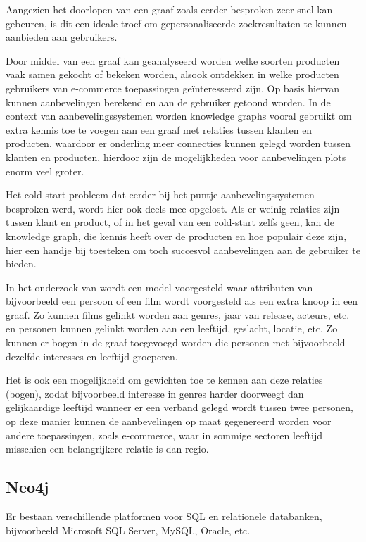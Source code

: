 Aangezien het doorlopen van een graaf zoals eerder besproken zeer snel kan gebeuren, is dit een ideale troef om gepersonaliseerde zoekresultaten te kunnen aanbieden aan gebruikers. \autocite{E-CommerceKnowledgeGraph}

Door middel van een graaf kan geanalyseerd worden welke soorten producten vaak samen gekocht of bekeken worden, alsook ontdekken in welke producten gebruikers van e-commerce toepassingen geïnteresseerd zijn. Op basis hiervan kunnen aanbevelingen berekend en aan de gebruiker getoond worden. 
\newpage
In de context van aanbevelingssystemen worden knowledge graphs vooral gebruikt om extra kennis toe te voegen aan een graaf met relaties tussen klanten en producten, waardoor er onderling meer connecties kunnen gelegd worden tussen klanten en producten, hierdoor zijn de mogelijkheden voor aanbevelingen plots enorm veel groter.
 
Het cold-start probleem dat eerder bij het puntje aanbevelingssystemen besproken werd, wordt hier ook deels mee opgelost. Als er weinig relaties zijn tussen klant en product, of in het geval van een cold-start zelfs geen, kan de knowledge graph, die kennis heeft over de producten en hoe populair deze zijn, hier een handje bij toesteken om toch succesvol aanbevelingen aan de gebruiker te bieden.

In het onderzoek van \cite{Grad-Gyenge2015} wordt een model voorgesteld waar attributen van bijvoorbeeld een persoon of een film wordt voorgesteld als een extra knoop in een graaf. Zo kunnen films gelinkt worden aan genres, jaar van release, acteurs, etc. en personen kunnen gelinkt worden aan een leeftijd, geslacht, locatie, etc.
Zo kunnen er bogen in de graaf toegevoegd worden die personen met bijvoorbeeld dezelfde interesses en leeftijd groeperen. 

Het is ook een mogelijkheid om gewichten toe te kennen aan deze relaties (bogen), zodat bijvoorbeeld interesse in genres harder doorweegt dan gelijkaardige leeftijd wanneer er een verband gelegd wordt tussen twee personen, op deze manier kunnen de aanbevelingen op maat gegenereerd worden voor andere toepassingen, zoals e-commerce, waar in sommige sectoren leeftijd misschien een belangrijkere relatie is dan regio.

\subsection{Neo4j}
\label{sec:Neo4j}

Er bestaan verschillende platformen voor SQL en relationele databanken, bijvoorbeeld Microsoft SQL Server, MySQL, Oracle, etc.
  
